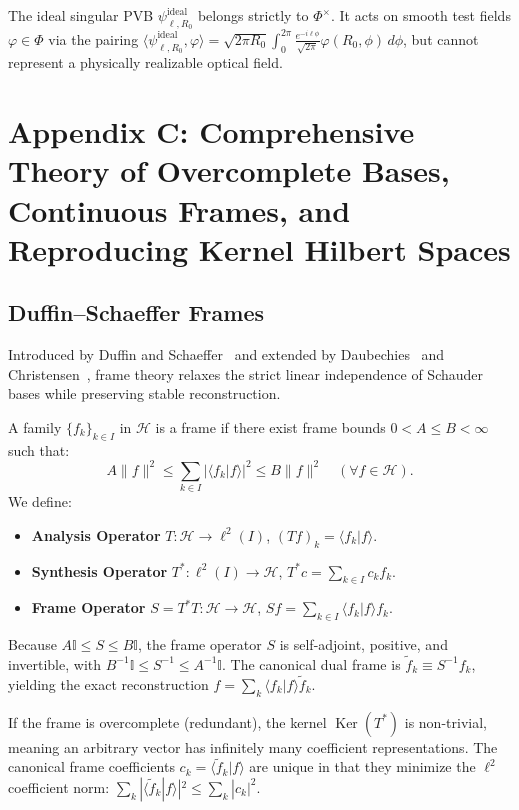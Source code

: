 \documentclass[11pt,a4paper]{article}
\begin{document}
The ideal singular PVB $\psi_{\ell, R_0}^{\text{ideal}}$ belongs strictly to $\Phi^\times$. It acts on smooth test fields $\varphi \in \Phi$ via the pairing $\langle \psi_{\ell, R_0}^{\text{ideal}}, \varphi \rangle = \sqrt{2\pi R_0} \int_0^{2\pi} \frac{e^{-i \ell \phi}}{\sqrt{2\pi}} \varphi(R_0, \phi) \, d\phi$, but cannot represent a physically realizable optical field.

\section{Appendix C: Comprehensive Theory of Overcomplete Bases, Continuous Frames, and Reproducing Kernel Hilbert Spaces}
\label{app:frames}

\subsection{Duffin--Schaeffer Frames}

Introduced by Duffin and Schaeffer~\cite{Duffin1952} and extended by Daubechies~\cite{Daubechies1990} and Christensen~\cite{Christensen2016}, frame theory relaxes the strict linear independence of Schauder bases while preserving stable reconstruction.

A family $\{f_k\}_{k \in I}$ in $\mathcal{H}$ is a frame if there exist frame bounds $0 < A \le B < \infty$ such that:
\begin{equation}
A \|f\|^2 \le \sum_{k \in I} |\langle f_k | f \rangle|^2 \le B \|f\|^2 \quad (\forall f \in \mathcal{H}).
\end{equation}
We define:
\begin{itemize}
    \item \textbf{Analysis Operator} $T: \mathcal{H} \to \ell^2(I)$, $(T f)_k = \langle f_k | f \rangle$.
    \item \textbf{Synthesis Operator} $T^*: \ell^2(I) \to \mathcal{H}$, $T^* c = \sum_{k \in I} c_k f_k$.
    \item \textbf{Frame Operator} $S = T^* T: \mathcal{H} \to \mathcal{H}$, $S f = \sum_{k \in I} \langle f_k | f \rangle f_k$.
\end{itemize}
Because $A \mathbb{I} \le S \le B \mathbb{I}$, the frame operator $S$ is self-adjoint, positive, and invertible, with $B^{-1} \mathbb{I} \le S^{-1} \le A^{-1} \mathbb{I}$. The canonical dual frame is $\widetilde{f}_k \equiv S^{-1} f_k$, yielding the exact reconstruction $f = \sum_k \langle f_k | f \rangle \widetilde{f}_k$.

If the frame is overcomplete (redundant), the kernel $\operatorname{Ker}(T^*)$ is non-trivial, meaning an arbitrary vector has infinitely many coefficient representations. The canonical frame coefficients $c_k = \langle \widetilde{f}_k | f \rangle$ are unique in that they minimize the $\ell^2$ coefficient norm: $\sum_k |\langle \widetilde{f}_k | f \rangle|^2 \le \sum_k |c_k|^2$.
\end{document}
